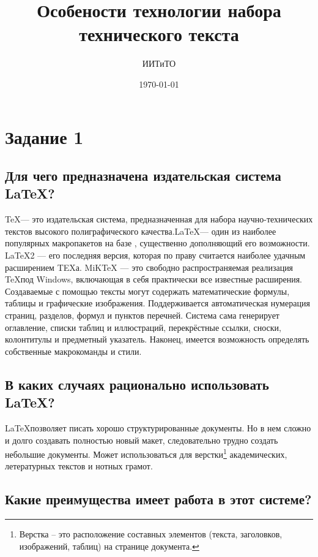\documentclass[a4paper,12pt]{article} %
\author{ИИТиТО}
\title{Особености технологии набора технического текста{}}
\date{\today}
\begin{document}
\maketitle
\newpage
\section{Задание 1}

\subsection{Для чего предназначена издательская система \LaTeX?}

\begin{flushleft}

\TeX  — это издательская система, предназначенная для набора научно-технических
текстов высокого полиграфического качества.\LaTeX  — один из наиболее популярных
макропакетов на базе , существенно дополняющий его возможности. \LaTeX 2 —
его последняя версия, которая по праву считается наиболее удачным расширением TEXа.
MiKTeX — это свободно распространяемая реализация \TeX  под Windows, включающая
в себя практически все известные расширения.
Создаваемые с помощью  тексты могут содержать математические формулы,
таблицы и графические изображения. Поддерживается автоматическая нумерация страниц, разделов, формул и пунктов перечней. Система сама генерирует оглавление, списки
таблиц и иллюстраций, перекрёстные ссылки, сноски, колонтитулы и предметный указатель. Наконец, имеется возможность определять собственные макрокоманды и стили.
\end{flushleft}
\begin{center}
\subsection{В каких случаях рационально использовать \LaTeX?}
\end{center}

\LaTeX позволяет писать хорошо структурированные документы. Но в нем сложно и долго создавать полностью новый макет, следовательно трудно создать небольшие документы. Может использоваться для верстки\footnote{Верстка -- это расположение составных элементов (текста, заголовков, изображений, таблиц) на странице документа. } академических, летературных текстов и нотных грамот.\\

\subsection{Какие преимущества имеет работа в этот системе?}
\end{document}
